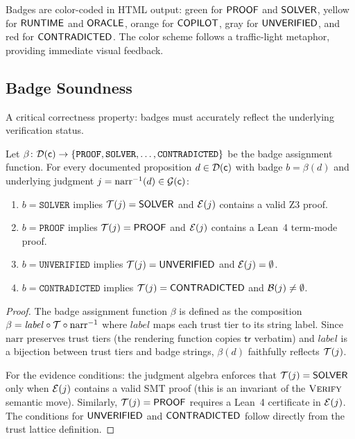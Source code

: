 \documentclass[11pt]{article}
\newcommand{\DocSheaf}{\mathcal{D}}
\newcommand{\NarrFunc}{\mathrm{narr}}
\newcommand{\tr}{\mathsf{tr}}                        %
\newcommand{\BadgeFunc}{\beta}                        %
\begin{document}
Badges are color-coded in HTML output: green for $\mathsf{PROOF}$ and
$\mathsf{SOLVER}$, yellow for $\mathsf{RUNTIME}$ and $\mathsf{ORACLE}$, orange for
$\mathsf{COPILOT}$, gray for $\mathsf{UNVERIFIED}$, and red for $\mathsf{CONTRADICTED}$.  The
color scheme follows a traffic-light metaphor, providing immediate
visual feedback.

\subsection{Badge Soundness}

A critical correctness property: badges must accurately reflect the
underlying verification status.

\begin{theorem}\label{thm:badge-sound}
Let $\BadgeFunc \colon \DocSheaf(\coord) \to \{\texttt{PROOF},
\texttt{SOLVER}, \ldots, \texttt{CONTRADICTED}\}$ be the badge
assignment function.  For every documented proposition $d \in
\DocSheaf(\coord)$ with badge $b = \BadgeFunc(d)$ and underlying
judgment $j = \NarrFunc^{-1}(d) \in \mathcal{G}(\coord)$:
\begin{enumerate}[noitemsep]
\item $b = \texttt{SOLVER}$ implies $\mathcal{T}(j) = \mathsf{SOLVER}$ and
  $\mathcal{E}(j)$ contains a valid Z3 proof.
\item $b = \texttt{PROOF}$ implies $\mathcal{T}(j) = \mathsf{PROOF}$ and
  $\mathcal{E}(j)$ contains a Lean~4 term-mode proof.
\item $b = \texttt{UNVERIFIED}$ implies $\mathcal{T}(j) = \mathsf{UNVERIFIED}$ and
  $\mathcal{E}(j) = \emptyset$.
\item $b = \texttt{CONTRADICTED}$ implies $\mathcal{T}(j) = \mathsf{CONTRADICTED}$ and
  $\mathcal{B}(j) \neq \emptyset$.
\end{enumerate}
\end{theorem}

\begin{proof}
The badge assignment function $\BadgeFunc$ is defined as the composition
$\BadgeFunc = \mathit{label} \circ \trust \circ \NarrFunc^{-1}$ where
$\mathit{label}$ maps each trust tier to its string label.  Since
$\NarrFunc$ preserves trust tiers (the rendering function copies $\tr$
verbatim) and $\mathit{label}$ is a bijection between trust tiers and
badge strings, $\BadgeFunc(d)$ faithfully reflects $\mathcal{T}(j)$.

For the evidence conditions: the judgment algebra enforces that
$\mathcal{T}(j) = \mathsf{SOLVER}$ only when $\mathcal{E}(j)$ contains a valid SMT
proof (this is an invariant of the $\textsc{Verify}$ semantic move).
Similarly, $\mathcal{T}(j) = \mathsf{PROOF}$ requires a Lean~4 certificate
in $\mathcal{E}(j)$.  The conditions for $\mathsf{UNVERIFIED}$ and $\mathsf{CONTRADICTED}$ follow
directly from the trust lattice definition.
\end{proof}
\end{document}
